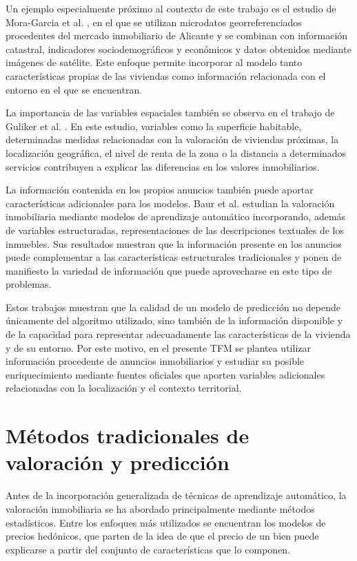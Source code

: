 \documentclass[IB]{TFUOC}%
\begin{document}
Un ejemplo especialmente próximo al contexto de este trabajo es el estudio de Mora-Garcia et al. \cite{moragarcia2022housing}, en el que se utilizan microdatos georreferenciados procedentes del mercado inmobiliario de Alicante y se combinan con información catastral, indicadores sociodemográficos y económicos y datos obtenidos mediante imágenes de satélite. Este enfoque permite incorporar al modelo tanto características propias de las viviendas como información relacionada con el entorno en el que se encuentran.

La importancia de las variables espaciales también se observa en el trabajo de Guliker et al. \cite{guliker2022spatial}. En este estudio, variables como la superficie habitable, determinadas medidas relacionadas con la valoración de viviendas próximas, la localización geográfica, el nivel de renta de la zona o la distancia a determinados servicios contribuyen a explicar las diferencias en los valores inmobiliarios.

La información contenida en los propios anuncios también puede aportar características adicionales para los modelos. Baur et al. \cite{baur2023automated} estudian la valoración inmobiliaria mediante modelos de aprendizaje automático incorporando, además de variables estructuradas, representaciones de las descripciones textuales de los inmuebles. Sus resultados muestran que la información presente en los anuncios puede complementar a las características estructurales tradicionales y ponen de manifiesto la variedad de información que puede aprovecharse en este tipo de problemas.

Estos trabajos muestran que la calidad de un modelo de predicción no depende únicamente del algoritmo utilizado, sino también de la información disponible y de la capacidad para representar adecuadamente las características de la vivienda y de su entorno. Por este motivo, en el presente TFM se plantea utilizar información procedente de anuncios inmobiliarios y estudiar su posible enriquecimiento mediante fuentes oficiales que aporten variables adicionales relacionadas con la localización y el contexto territorial.

\section{Métodos tradicionales de valoración y predicción}

Antes de la incorporación generalizada de técnicas de aprendizaje automático, la valoración inmobiliaria se ha abordado principalmente mediante métodos estadísticos. Entre los enfoques más utilizados se encuentran los modelos de precios hedónicos, que parten de la idea de que el precio de un bien puede explicarse a partir del conjunto de características que lo componen.
\end{document}

